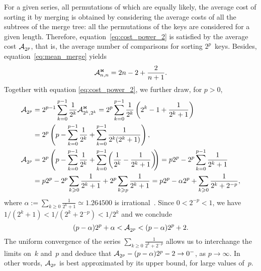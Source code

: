 For a given series, all permutations of which are equally likely, the
average cost of sorting it by merging is obtained by considering the
average costs of all the subtrees of the merge tree: all the
permutations of the keys are considered for a given length. Therefore,
equation~\eqref{eq:cost_power_2} is satisfied by the average cost
\(\mathcal{A}_{2^p}^{}\), that is, the average number of comparisons for sorting
\(2^p\)~keys. Besides, equation~\eqref{eq:mean_merge} yields
\begin{equation*}
\mathcal{A}_{n,n}^{\Join} = 2n - 2 + \frac{2}{n+1}.
\end{equation*}
Together with equation \eqref{eq:cost_power_2}, we further draw, for
\(p > 0\),
\begin{align*}
\abovedisplayskip=0pt
\belowdisplayskip=0pt
\M{}{2^p}
  &= 2^{p-1}\sum_{k=0}^{p-1}{\frac{1}{2^k}\M{\Join}{2^k,2^k}}
  = 2^p\sum_{k=0}^{p-1}{\frac{1}{2^k}\left(2^k - 1 + \frac{1}{2^k +
      1}\right)}\notag\\
  &= 2^{p}\left(p - \sum_{k=0}^{p-1}{\frac{1}{2^k}}
     + \sum_{k=0}^{p-1}{\frac{1}{2^k(2^k+1)}}\right),\notag\\
\M{}{2^p}
  &= 2^{p}\left(p - \sum_{k=0}^{p-1}{\frac{1}{2^k}}
     + \sum_{k=0}^{p-1}\left(\frac{1}{2^k}
     - \frac{1}{2^k+1}\right)\!\!\right)
   = p2^p - 2^p \sum_{k=0}^{p-1}\frac{1}{2^k+1}\notag\\
  &= p2^p - 2^p \sum_{k \geqslant 0}\frac{1}{2^k+1}
     + 2^p \sum_{k \geqslant p}\frac{1}{2^k+1}
   = p2^p - \alpha 2^p + \sum_{k \geqslant 0}\frac{1}{2^{k}+2^{-p}},
\end{align*}
where \(\alpha := \sum_{k \geqslant 0}\frac{1}{2^k+1} \simeq
1.264500\) is irrational~\cite{Borwein:1992}. Since \(0 < 2^{-p} <
1\), we have \(1/(2^k + 1) < 1/(2^k+2^{-p}) < 1/2^k\) and we conclude
\begin{equation}
(p - \alpha)2^p + \alpha < \mathcal{A}_{2^p}^{} < (p-\alpha)2^p + 2.
\label{ineq:M_join}
\end{equation}
The uniform convergence of the series \(\sum_{k \geqslant
  0}\frac{1}{2^{k}+2^{-p}}\) allows us to interchange the limits
on~\(k\) and~\(p\) and deduce that \(\mathcal{A}_{2^p}^{} - (p-\alpha)2^p - 2 \to
0^{-}\), as \(p \to \infty\). In other words, \(\mathcal{A}_{2^p}^{}\) is best
approximated by its upper bound, for large values of~\(p\).
